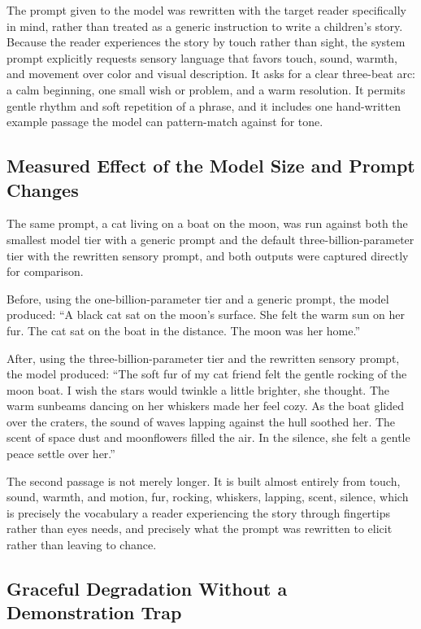 \documentclass[conference]{IEEEtran}
\begin{document}
The prompt given to the model was rewritten with the target reader specifically in mind, rather than treated as a generic instruction to write a children's story. Because the reader experiences the story by touch rather than sight, the system prompt explicitly requests sensory language that favors touch, sound, warmth, and movement over color and visual description. It asks for a clear three-beat arc: a calm beginning, one small wish or problem, and a warm resolution. It permits gentle rhythm and soft repetition of a phrase, and it includes one hand-written example passage the model can pattern-match against for tone.

\subsection{Measured Effect of the Model Size and Prompt Changes}

The same prompt, a cat living on a boat on the moon, was run against both the smallest model tier with a generic prompt and the default three-billion-parameter tier with the rewritten sensory prompt, and both outputs were captured directly for comparison.

Before, using the one-billion-parameter tier and a generic prompt, the model produced: ``A black cat sat on the moon's surface. She felt the warm sun on her fur. The cat sat on the boat in the distance. The moon was her home.''

After, using the three-billion-parameter tier and the rewritten sensory prompt, the model produced: ``The soft fur of my cat friend felt the gentle rocking of the moon boat. I wish the stars would twinkle a little brighter, she thought. The warm sunbeams dancing on her whiskers made her feel cozy. As the boat glided over the craters, the sound of waves lapping against the hull soothed her. The scent of space dust and moonflowers filled the air. In the silence, she felt a gentle peace settle over her.''

The second passage is not merely longer. It is built almost entirely from touch, sound, warmth, and motion, fur, rocking, whiskers, lapping, scent, silence, which is precisely the vocabulary a reader experiencing the story through fingertips rather than eyes needs, and precisely what the prompt was rewritten to elicit rather than leaving to chance.

\subsection{Graceful Degradation Without a Demonstration Trap}
\end{document}
